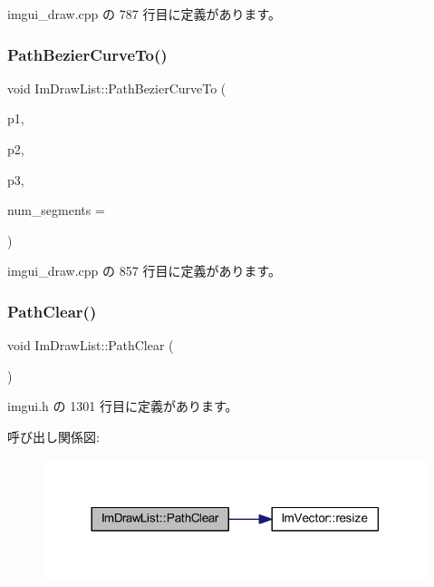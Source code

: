  imgui\+\_\+draw.\+cpp の 787 行目に定義があります。

\mbox{\label{struct_im_draw_list_a495ca7dd4fd5a898e2414658321f4b18}} 
\subsubsection{\texorpdfstring{Path\+Bezier\+Curve\+To()}{PathBezierCurveTo()}}
{\footnotesize\ttfamily void Im\+Draw\+List\+::\+Path\+Bezier\+Curve\+To (\begin{DoxyParamCaption}\item[{const \mbox{\hyperlink{struct_im_vec2}{Im\+Vec2}} \&}]{p1,  }\item[{const \mbox{\hyperlink{struct_im_vec2}{Im\+Vec2}} \&}]{p2,  }\item[{const \mbox{\hyperlink{struct_im_vec2}{Im\+Vec2}} \&}]{p3,  }\item[{int}]{num\+\_\+segments = {} }\end{DoxyParamCaption})}



 imgui\+\_\+draw.\+cpp の 857 行目に定義があります。

\mbox{\label{struct_im_draw_list_ae9ad5f4d638b1bfd9383618dc60e3f18}} 
\subsubsection{\texorpdfstring{Path\+Clear()}{PathClear()}}
{\footnotesize\ttfamily void Im\+Draw\+List\+::\+Path\+Clear (\begin{DoxyParamCaption}{ }\end{DoxyParamCaption})\hspace{0.3cm}{\ttfamily [inline]}}



 imgui.\+h の 1301 行目に定義があります。

呼び出し関係図\+:\nopagebreak
\begin{figure}[H]
\begin{center}
\leavevmode
\includegraphics[width=317pt]{struct_im_draw_list_ae9ad5f4d638b1bfd9383618dc60e3f18_cgraph}
\end{center}
\end{figure}
\mbox{\label{struct_im_draw_list_aea9301cb99ebf4b27f5d3959017567c9}} 
